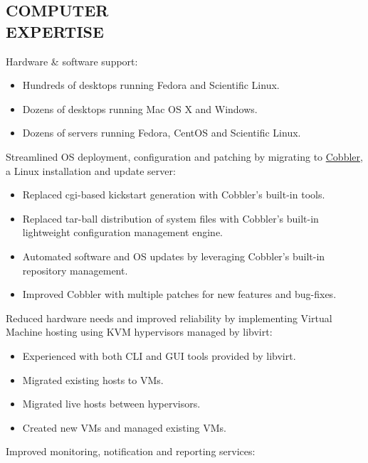 \documentclass[line,margin]{res}
\begin{document}
\begin{resume}
\section{COMPUTER \\ EXPERTISE}
    Hardware \& software support: \\
    \begin{itemize}
        \item Hundreds of desktops running Fedora and Scientific Linux.
        \item Dozens of desktops running Mac OS X and Windows.
        \item Dozens of servers running Fedora, CentOS and Scientific Linux.
    \end{itemize}
    Streamlined OS deployment, configuration and patching by migrating to
    \href{http://cobbler.github.com/}{Cobbler}, a Linux installation and
    update server: \\
    \begin{itemize}
        \item Replaced cgi-based kickstart generation with Cobbler's built-in
        tools.
        \item Replaced tar-ball distribution of system files with
        Cobbler's built-in lightweight configuration management engine.
        \item Automated software and OS updates by leveraging Cobbler's
        built-in repository management.
        \item Improved Cobbler with multiple patches for new features and
        bug-fixes.
    \end{itemize}
    Reduced hardware needs and improved reliability by implementing
    Virtual Machine hosting using KVM hypervisors managed by libvirt: \\
    \begin{itemize}
        \item Experienced with both CLI and GUI tools provided by libvirt.
        \item Migrated existing hosts to VMs.
        \item Migrated live hosts between hypervisors.
        \item Created new VMs and managed existing VMs.
    \end{itemize}
    Improved monitoring, notification and reporting services: \\

\end{resume}
\end{document}
